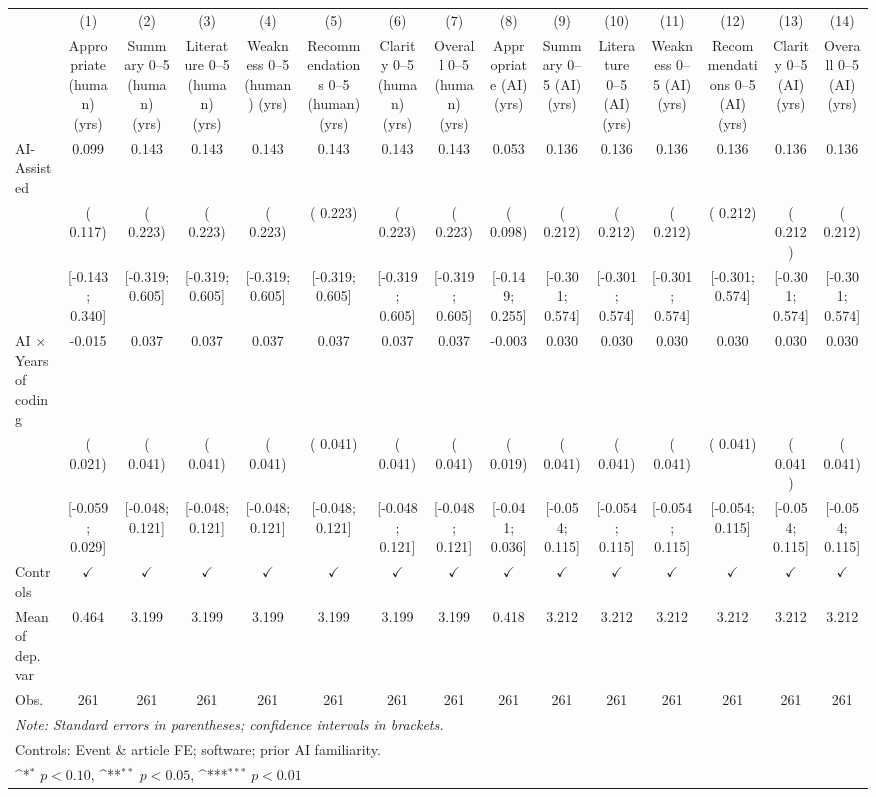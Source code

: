 \def\sym#1{\ifmmode^{#1}\else\(^{#1}\)\fi}
\begin{tabular}{l*{14}{c}}
\hline\hline
 & (1) & (2) & (3) & (4) & (5) & (6) & (7) & (8) & (9) & (10) & (11) & (12) & (13) & (14)
\\
 & Appropriate (human) (yrs) & Summary 0–5 (human) (yrs) & Literature 0–5 (human) (yrs) & Weakness 0–5 (human) (yrs) & Recommendations 0–5 (human) (yrs) & Clarity 0–5 (human) (yrs) & Overall 0–5 (human) (yrs) & Appropriate (AI) (yrs) & Summary 0–5 (AI) (yrs) & Literature 0–5 (AI) (yrs) & Weakness 0–5 (AI) (yrs) & Recommendations 0–5 (AI) (yrs) & Clarity 0–5 (AI) (yrs) & Overall 0–5 (AI) (yrs)
 \\
\hline
AI-Assisted &  0.099 &  0.143 &  0.143 &  0.143 &  0.143 &  0.143 &  0.143 &  0.053 &  0.136 &  0.136 &  0.136 &  0.136 &  0.136 &  0.136
\\
 & ( 0.117) & ( 0.223) & ( 0.223) & ( 0.223) & ( 0.223) & ( 0.223) & ( 0.223) & ( 0.098) & ( 0.212) & ( 0.212) & ( 0.212) & ( 0.212) & ( 0.212) & ( 0.212)
\\
 & [-0.143;  0.340] & [-0.319;  0.605] & [-0.319;  0.605] & [-0.319;  0.605] & [-0.319;  0.605] & [-0.319;  0.605] & [-0.319;  0.605] & [-0.149;  0.255] & [-0.301;  0.574] & [-0.301;  0.574] & [-0.301;  0.574] & [-0.301;  0.574] & [-0.301;  0.574] & [-0.301;  0.574]
\\
AI × Years of coding & -0.015 &  0.037 &  0.037 &  0.037 &  0.037 &  0.037 &  0.037 & -0.003 &  0.030 &  0.030 &  0.030 &  0.030 &  0.030 &  0.030
\\
 & ( 0.021) & ( 0.041) & ( 0.041) & ( 0.041) & ( 0.041) & ( 0.041) & ( 0.041) & ( 0.019) & ( 0.041) & ( 0.041) & ( 0.041) & ( 0.041) & ( 0.041) & ( 0.041)
\\
 & [-0.059;  0.029] & [-0.048;  0.121] & [-0.048;  0.121] & [-0.048;  0.121] & [-0.048;  0.121] & [-0.048;  0.121] & [-0.048;  0.121] & [-0.041;  0.036] & [-0.054;  0.115] & [-0.054;  0.115] & [-0.054;  0.115] & [-0.054;  0.115] & [-0.054;  0.115] & [-0.054;  0.115]
\\
\hline
Controls & $\checkmark$ & $\checkmark$ & $\checkmark$ & $\checkmark$ & $\checkmark$ & $\checkmark$ & $\checkmark$ & $\checkmark$ & $\checkmark$ & $\checkmark$ & $\checkmark$ & $\checkmark$ & $\checkmark$ & $\checkmark$
\\
Mean of dep. var &  0.464 &  3.199 &  3.199 &  3.199 &  3.199 &  3.199 &  3.199 &  0.418 &  3.212 &  3.212 &  3.212 &  3.212 &  3.212 &  3.212
\\
Obs. & 261 & 261 & 261 & 261 & 261 & 261 & 261 & 261 & 261 & 261 & 261 & 261 & 261 & 261
\\
\hline
\hline\hline
\multicolumn{15}{l}{\it{Note:} Standard errors in parentheses; confidence intervals in brackets.}\\
\multicolumn{15}{l}{Controls: Event \& article FE; software; prior AI familiarity.}\\
\multicolumn{15}{l}{\sym{*} $p<0.10$, \sym{**} $p<0.05$,  \sym{***} $p<0.01$}\\
\end{tabular}
